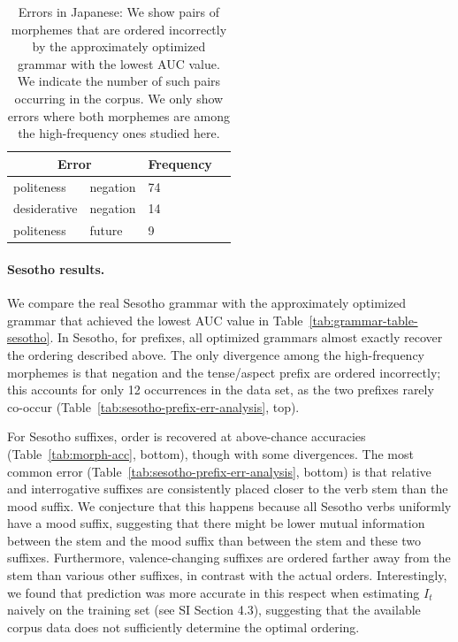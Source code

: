 \begin{table} %
    \centering
    \begin{tabular}{ll|ll}
    \multicolumn{2}{c|}{Error} & Frequency \\ \hline\hline
politeness & negation & 74 \\
desiderative & negation & 14 \\
politeness & future & 9 \\
\end{tabular}
    \caption{Errors in Japanese: We show pairs of morphemes that are ordered incorrectly by the approximately optimized grammar with the lowest AUC value.
    We indicate the number of such pairs occurring in the corpus.
    We only show errors where both morphemes are among the high-frequency ones studied here.
    }
    \label{tab:jap-err-analysis}
\end{table}

\paragraph{Sesotho results.} We compare the real Sesotho grammar with the approximately optimized grammar that achieved the lowest AUC value in Table~\ref{tab:grammar-table-sesotho}. %
In Sesotho, for prefixes, all optimized grammars almost exactly recover the ordering described above.
The only divergence among the high-frequency morphemes is that negation and the tense/aspect prefix are ordered incorrectly; this accounts for only 12 occurrences in the data set, as the two prefixes rarely co-occur (Table~\ref{tab:sesotho-prefix-err-analysis}, top).

For Sesotho suffixes, order is recovered at above-chance accuracies (Table~\ref{tab:morph-acc}, bottom), though with some divergences.
The most common error (Table~\ref{tab:sesotho-prefix-err-analysis}, bottom) is that relative and interrogative suffixes are consistently placed closer to the verb stem than the mood suffix.
We conjecture that this happens because all Sesotho verbs uniformly have a mood suffix, suggesting that there might be lower mutual information between the stem and the mood suffix than between the stem and these two suffixes.
Furthermore, valence-changing suffixes are ordered farther away from the stem than various other suffixes, in contrast with the actual orders.
Interestingly, we found that prediction was more accurate in this respect when estimating $I_t$ naively  on the training set (see SI Section 4.3), suggesting that the available corpus data does not sufficiently determine the optimal ordering.


